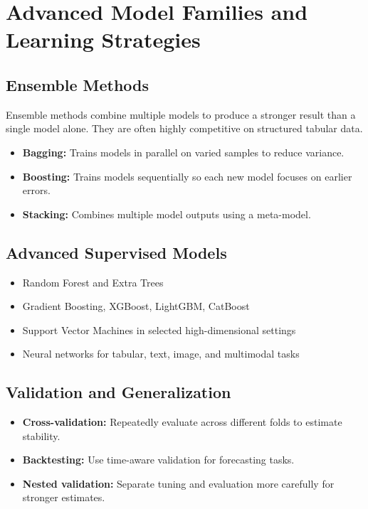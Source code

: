 \documentclass[11pt,a4paper]{article}
\begin{document}
\section{Advanced Model Families and Learning Strategies}

\subsection{Ensemble Methods}

\begin{definitionbox}
Ensemble methods combine multiple models to produce a stronger result than a single model alone. They are often highly competitive on structured tabular data.
\end{definitionbox}

\begin{itemize}[leftmargin=*]
  \item \textbf{Bagging:} Trains models in parallel on varied samples to reduce variance.
  \item \textbf{Boosting:} Trains models sequentially so each new model focuses on earlier errors.
  \item \textbf{Stacking:} Combines multiple model outputs using a meta-model.
\end{itemize}

\subsection{Advanced Supervised Models}

\begin{itemize}[leftmargin=*]
  \item Random Forest and Extra Trees
  \item Gradient Boosting, XGBoost, LightGBM, CatBoost
  \item Support Vector Machines in selected high-dimensional settings
  \item Neural networks for tabular, text, image, and multimodal tasks
\end{itemize}

\subsection{Validation and Generalization}

\begin{itemize}[leftmargin=*]
  \item \textbf{Cross-validation:} Repeatedly evaluate across different folds to estimate stability.
  \item \textbf{Backtesting:} Use time-aware validation for forecasting tasks.
  \item \textbf{Nested validation:} Separate tuning and evaluation more carefully for stronger estimates.
\end{itemize}
\end{document}
